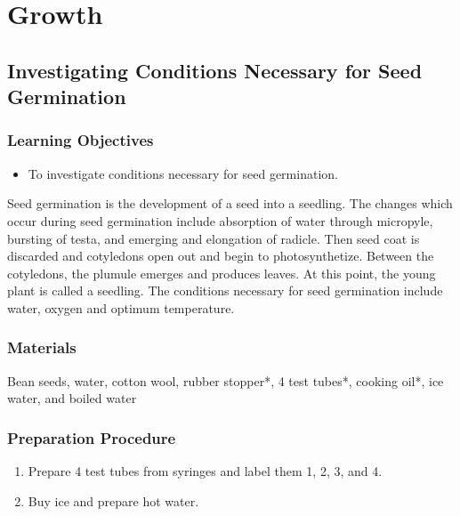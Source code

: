 \section{Growth}

\subsection{Investigating Conditions Necessary for Seed Germination}

\subsubsection*{Learning Objectives}
\begin{itemize}
\item{To investigate conditions necessary for seed germination.}
\end{itemize}


Seed germination is the development of a seed into a seedling. The changes which occur during seed germination include absorption of water through micropyle, bursting of testa, and emerging and elongation of radicle. Then seed coat is discarded and cotyledons open out and begin to photosynthetize. Between the cotyledons, the plumule emerges and produces leaves. At this point, the young plant is called a seedling. The conditions necessary for seed germination include water, oxygen and optimum temperature.

\subsubsection*{Materials}
Bean seeds, water, cotton wool, rubber stopper*, 4 test tubes*, cooking oil*, ice water, and boiled water

\subsubsection*{Preparation Procedure}
\begin{enumerate}
\item{Prepare 4 test tubes from syringes and label them 1, 2, 3, and 4.}
\item{Buy ice and prepare hot water.}
\end{enumerate}

